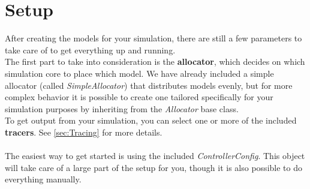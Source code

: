 \section{Setup}

After creating the models for your simulation, there are still a few parameters to take care of to get everything up and running.\\

The first part to take into consideration is the \textbf{allocator}, which decides on which simulation core to place which model. We have already included a simple allocator (called \textsl{SimpleAllocator}) that distributes models evenly, but for more complex behavior it is possible to create one tailored specifically for your simulation purposes by inheriting from the \textsl{Allocator} base class.\\

To get output from your simulation, you can select one or more of the included \textbf{tracers}. See \ref{sec:Tracing} for more details.\\
\\
The easiest way to get started is using the included \textsl{ControllerConfig}. This object will take care of a large part of the setup for you, though it is also possible to do everything manually.\\

